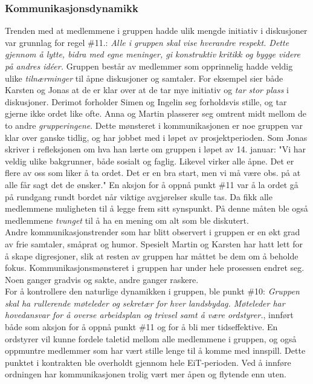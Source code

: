 \subsubsection{Kommunikasjonsdynamikk}

Trenden med at medlemmene i gruppen hadde ulik mengde initiativ i diskusjoner var grunnlag for regel \#11.: \textit{Alle i gruppen skal vise hverandre respekt. Dette gjennom å lytte, bidra med egne meninger, gi konstruktiv kritikk og bygge videre på andres id\'{e}er.} 
Gruppen består av medlemmer som opprinnelig hadde veldig ulike \textit{tilnærminger} til åpne diskusjoner og samtaler.
For eksempel sier både Karsten og Jonas at de er klar over at de tar mye initiativ og \textit{tar stor plass} i diskusjoner.
Derimot forholder Simen og Ingelin seg forholdsvis stille, og tar gjerne ikke ordet like ofte.
Anna og Martin plasserer seg omtrent midt mellom de to andre \textit{grupperingene}.
Dette mønsteret i kommunikasjonen er noe gruppen var klar over ganske tidlig, og har jobbet med i løpet av prosjektperioden.
Som Jonas skriver i refleksjonen om hva han lærte om gruppen i løpet av 14. januar:
"Vi har veldig ulike bakgrunner, både sosialt og faglig. Likevel virker alle åpne. Det er flere av oss som liker å ta ordet. Det er en bra start, men vi må være obs. på at alle får sagt det de ønsker."
En aksjon for å oppnå punkt \#11 var å la ordet gå på rundgang rundt bordet når viktige avgjørelser skulle tas. Da fikk alle medlemmene muligheten til å legge frem sitt synspunkt. På denne måten ble også medlemmene \textit{tvunget} til å ha en mening om alt som ble diskutert. \\

Andre kommunikasjonstrender som har blitt observert i gruppen er en økt grad av frie samtaler, småprat og humor. Spesielt Martin og Karsten har hatt lett for å skape digresjoner, slik at resten av gruppen har måttet be dem om å beholde fokus. 
Kommunikasjonsmønsteret i gruppen har under hele prosessen endret seg.
Noen ganger gradvis og sakte, andre ganger raskere. \\

For å kontrollere den naturlige dynamikken i gruppen, ble punkt \#10: \textit{Gruppen skal ha rullerende møteleder og sekretær for hver landsbydag. Møteleder har hovedansvar for å overse arbeidsplan og trivsel samt å være ordstyrer.}, innført både som aksjon for å oppnå punkt \#11 og for å bli mer tidseffektive. En ordstyrer vil kunne fordele taletid mellom alle medlemmene i gruppen, og også oppmuntre medlemmer som har vært stille lenge til å komme med innspill. Dette punktet i kontrakten ble overholdt gjennom hele EiT-perioden. Ved å innføre ordningen har kommunikasjonen trolig vært mer åpen og flytende enn uten.
